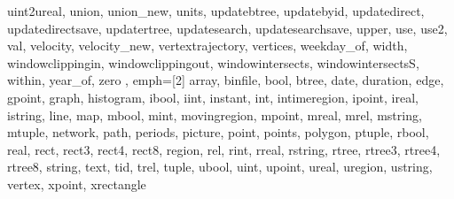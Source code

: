 {{        uint2ureal, union, union\_new, units, updatebtree, updatebyid, updatedirect, updatedirectsave, 
        updatertree, updatesearch, updatesearchsave, upper, use, use2, val, velocity, velocity\_new, 
        vertextrajectory, vertices, weekday\_of, width, windowclippingin, windowclippingout, 
        windowintersects, windowintersectsS, within, year\_of, zero },
                                  emph=[2]{ array, binfile, bool, btree, date, duration, 
                                            edge, gpoint, graph, histogram, 
        ibool, iint, instant, int, intimeregion, ipoint, ireal, istring, line, map, 
        mbool, mint, movingregion, mpoint, mreal, mrel, mstring, mtuple, network, 
        path, periods, picture, point, points, polygon, ptuple, rbool, real, rect, 
        rect3, rect4, rect8, region, rel, rint, rreal, rstring, rtree, rtree3, rtree4, 
        rtree8, string, text, tid, trel, tuple, ubool, uint, upoint, ureal, uregion, 
        ustring, vertex, xpoint, xrectangle}
                                  }

